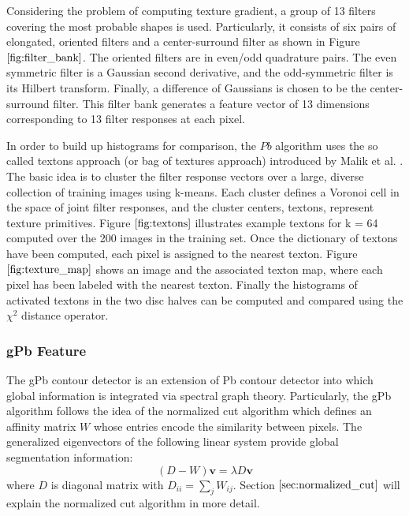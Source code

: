 \documentclass{SMBV12}
\begin{document}
Considering the problem of computing texture gradient, a group of 13 filters covering the most probable shapes is used. Particularly, it consists of six pairs of elongated, oriented filters and a center-surround filter as shown in Figure $\ref{fig:filter_bank}$. The oriented filters are in even/odd quadrature pairs. The even symmetric filter is a Gaussian second derivative, and the odd-symmetric filter is its Hilbert transform. Finally, a difference of Gaussians is chosen to be the center-surround filter. This filter bank generates a feature vector of 13 dimensions corresponding to 13 filter responses at each pixel.

In order to build up histograms for comparison, the $Pb$ algorithm uses the so called textons approach (or bag of textures approach) introduced by Malik et al. \cite{malik2001contour}. The basic idea is to cluster the filter response vectors over a large, diverse collection of training images using k-means. Each cluster defines a Voronoi cell in the space of joint filter responses, and the cluster centers, textons, represent texture primitives. Figure $\ref{fig:textons}$ illustrates example textons for k = 64 computed over the 200 images in the training set. Once the dictionary of textons have been computed, each pixel is assigned to the nearest texton. Figure $\ref{fig:texture_map}$ shows an image and the associated texton map, where each pixel has been labeled with the nearest texton. Finally the histograms of activated textons in the two disc halves can be computed and compared using the $\chi^2$ distance operator.

\subsubsection{gPb Feature}

The gPb contour detector \cite{maire2008using} is an extension of Pb contour detector into which global information is integrated via spectral graph theory. Particularly, the gPb algorithm follows the idea of the normalized cut algorithm which defines an affinity matrix $W$ whose entries encode the similarity between pixels. The generalized eigenvectors of the following linear system provide global segmentation information:
\begin{equation}
(D-W)\mathbf{v} = \lambda D \mathbf{v}
\label{eq:ncut}
\end{equation}
where $D$ is diagonal matrix with $D_{ii} = \sum_j W_{ij}$.
Section $\ref{sec:normalized_cut}$ will explain the normalized cut algorithm in more detail.
\end{document}

